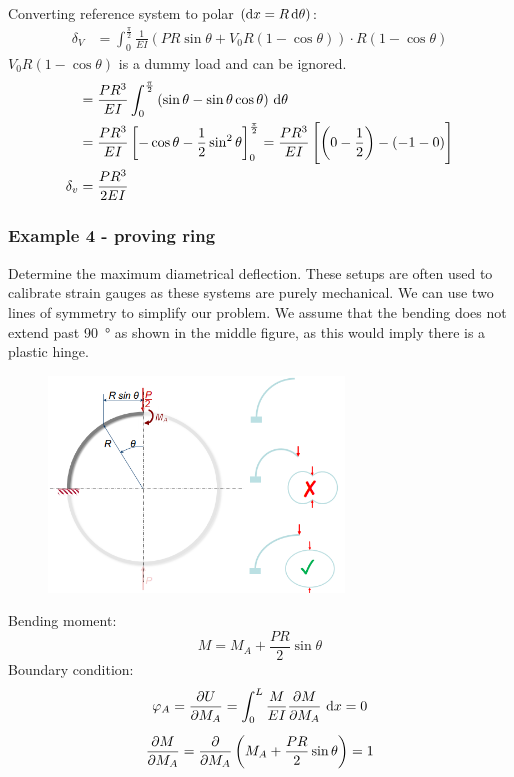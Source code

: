 \documentclass[class=report, crop=false, 12pt,a4paper]{standalone}
\begin{document}
Converting reference system to polar $\left(\dif x = R \dif \theta\right)$:
\begin{align}
  \delta_V &= \int_0^{\frac{\pi}{2}} \frac{1}{EI} \left(PR\sin\theta + V_0R(1-\cos\theta)\right)\cdot R\left(1-\cos\theta\right)
\end{align}
$V_0R(1-\cos\theta)$ is a dummy load and can be ignored.
\begin{align}
  &= \frac{PR^3}{EI} \int_0^{\frac{\pi}{2}} \left(\sin\theta - \sin\theta\cos\theta\right)\, \dif \theta\\
  &= \frac{PR^3}{EI} \left[-\cos\theta - \frac{1}{2}\sin^2\theta\right]_0^{\frac{\pi}{2}} = \frac{PR^3}{EI}\left[\left(0-\frac{1}{2}\right)-\left(-1-0\right)\right]\\
  \delta_v &= \frac{PR^3}{2EI}
\end{align}
\subsubsection{Example 4 - proving ring}
Determine the maximum diametrical deflection. These setups are often used to calibrate strain gauges as these systems are purely mechanical. We can use two lines of symmetry to simplify our problem. We assume that the bending does not extend past \SI{90}{\degree} as shown in the middle figure, as this would imply there is a plastic hinge. 
\begin{figure}[H]
  \centering
  \includegraphics[width = 0.7\textwidth]{../img/diagram19.png}
  \caption{}
\end{figure}
Bending moment:
\begin{equation}
  M = M_A + \frac{PR}{2} \sin\theta
\end{equation}
Boundary condition:
\begin{gather}
  \varphi_A = \frac{\partial U}{\partial M_A } = \int_0^L \frac{M}{EI} \frac{\partial M}{\partial M_A}\, \dif x = 0\\[5pt]
  \frac{\partial M}{\partial M_A} = \frac{\partial}{\partial M_A} \left(M_A + \frac{PR}{2}\sin\theta\right)=1
\end{gather}
\end{document}

